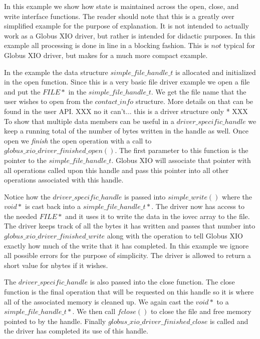 \documentclass[11pt]{article}
\begin{document}
In this example we show how state is maintained across the open, close,
and write interface functions.  The reader should note that this is
a greatly over simplified example for the purpose of explanation.  It is
not intended to actually work as a Globus XIO driver, but rather is intended
for didactic purposes.  In this example all processing is done in line in a
blocking fashion.  This is $not$ typical for Globus XIO driver, but makes for
a much more compact example.

In the example the data structure $simple\_file\_handle\_t$ is allocated
and initialized in the open function.  Since this is a very basic file
driver example we open a file and put the $FILE *$ in the 
$simple\_file\_handle\_t$.  We get the file name that the user wishes to
open from the $contact\_info$ structure.  More details on that can be found
in the user API. XXX no it can't... this is a driver structure only * XXX
To show that multiple data members can be useful in a
$driver\_specific\_handle$
we keep a running total of the number of bytes written in the handle as well.
Once open we \emph{finish} the open operation with a call to
$globus\_xio\_driver\_finished\_open()$.  The first parameter to this function
is the pointer to the $simple\_file\_handle\_t$.  Globus XIO will associate
that pointer with all operations called upon this handle and pass this 
pointer into all other operations associated with this handle.

Notice how the $driver\_specific\_handle$ is passed into $simple\_write()$
where the $void *$ is cast back into a $simple\_file\_handle\_t *$.  The
driver now has access to the needed $FILE *$ and it uses it to write the 
data in the iovec array to the file.  The driver keeps track of all
the bytes it has written and passes that number into 
$globus\_xio\_driver\_finished\_write$ along with the operation to 
tell Globus XIO exactly how much of the write that it has completed.  
In this example we ignore all possible errors for the purpose of simplicity.
The driver is allowed to return a short value for nbytes if it wishes.

The $driver\_specific\_handle$ is also passed into the close function.
The close function is the final operation that will be requested on this 
handle so it is where all of the associated memory is cleaned up.  We
again cast the $void *$ to a $simple\_file\_handle\_t *$.  We then call 
$fclose()$ to close the file and free memory pointed to by the handle.
Finally $globus\_xio\_driver\_finished\_close$ is called and the driver has 
completed its use of this handle.
\end{document}
